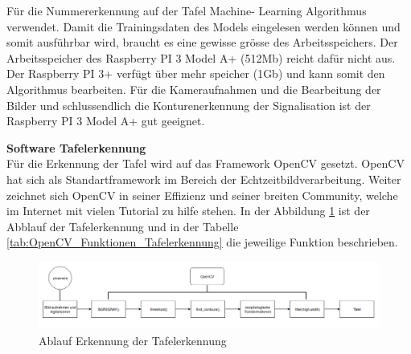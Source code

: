 \documentclass[../../main.tex]{subfiles}
\begin{document}
    Für die Nummererkennung auf der Tafel Machine- Learning Algorithmus verwendet. Damit die Trainingsdaten des Models eingelesen werden können und somit ausführbar wird, braucht es eine gewisse grösse des Arbeitsspeichers. Der Arbeitsspeicher des Raspberry PI 3 Model A+ (512Mb) reicht dafür nicht aus. Der Raspberry PI 3+ verfügt über mehr speicher (1Gb) und kann somit den Algorithmus bearbeiten. Für die Kameraufnahmen und die Bearbeitung der Bilder und schlussendlich die Konturenerkennung der Signalisation ist der Raspberry PI 3 Model A+  gut geeignet.
    \pagebreak

    \textbf{Software Tafelerkennung}\\
    Für die Erkennung der Tafel wird auf das Framework OpenCV gesetzt. OpenCV hat sich als Standartframework im Bereich der Echtzeitbildverarbeitung. Weiter zeichnet sich OpenCV in seiner Effizienz und seiner breiten Community, welche im Internet mit vielen Tutorial zu hilfe stehen. In der Abbildung \ref{fig:ablauf_tafelerkennung} ist der Abblauf der Tafelerkennung und in der Tabelle \ref{tab:OpenCV_Funktionen_Tafelerkennung} die jeweilige Funktion beschrieben.



    \begin{figure}[H] %
        \centering
        \includegraphics[width=1\textwidth]{Ablauf_Tafelerkennung.png}
        \caption{Ablauf Erkennung der Tafelerkennung}
        \label{fig:ablauf_tafelerkennung}
    \end{figure}
\end{document}
